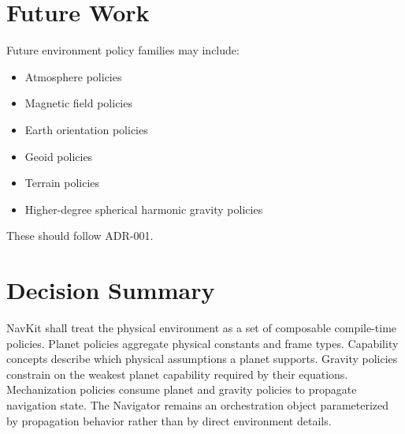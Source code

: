\documentclass[11pt]{article}
\begin{document}
\section{Future Work}

Future environment policy families may include:

\begin{itemize}
    \item Atmosphere policies
    \item Magnetic field policies
    \item Earth orientation policies
    \item Geoid policies
    \item Terrain policies
    \item Higher-degree spherical harmonic gravity policies
\end{itemize}

These should follow ADR-001.

\section{Decision Summary}

NavKit shall treat the physical environment as a set of composable
compile-time policies. Planet policies aggregate physical constants and frame
types. Capability concepts describe which physical assumptions a planet
supports. Gravity policies constrain on the weakest planet capability required
by their equations. Mechanization policies consume planet and gravity policies
to propagate navigation state. The Navigator remains an orchestration object
parameterized by propagation behavior rather than by direct environment
details.
\end{document}
